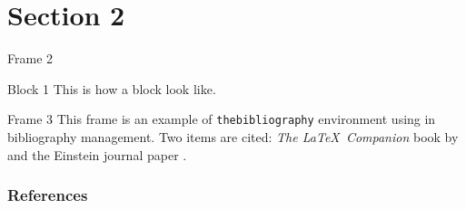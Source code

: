 \documentclass[aspectratio=169]{beamer}
\begin{document}
\section{Section 2}   
\begin{frame}{Frame 2}
\begin{block}{Block 1}
This is how a block look like.
\end{block}
    
\end{frame}
\begin{frame}{Frame 3}
    This frame is an example of \texttt{thebibliography} environment using 
in bibliography management. Two items are cited: \textit{The \LaTeX\ Companion} 
book by \cite{gossens.1993} and the Einstein journal paper \citep{einstein.1905}. 
\end{frame}

\begin{frame}[allowframebreaks]
        \frametitle{References}
        
\end{frame}
\end{document}
